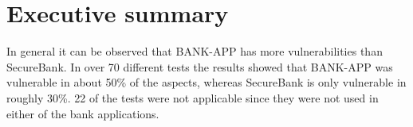\chapter{Executive summary}
In general it can be observed that BANK-APP has more vulnerabilities than SecureBank. In over 70 different tests the results showed that BANK-APP was vulnerable in about 50\% of the aspects, whereas SecureBank is only vulnerable in roughly 30\%. 22 of the tests were not applicable since they were not used in either of the bank applications.